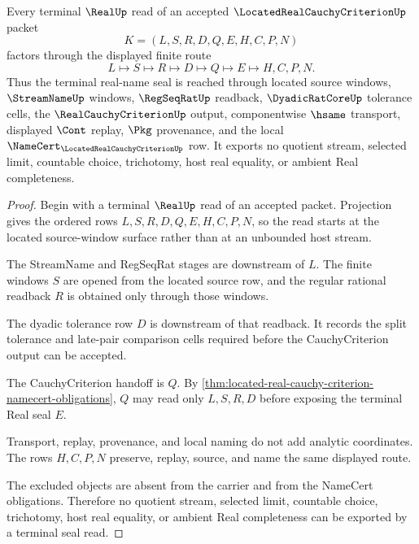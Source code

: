 \begin{theorem}
\label{thm:located-real-cauchy-criterion-terminal-seal-route}
Every terminal $\RealUp$ read of an accepted $\LocatedRealCauchyCriterionUp$ packet
$$
K=(L,S,R,D,Q,E,H,C,P,N)
$$
factors through the displayed finite route
$$
L \longmapsto S \longmapsto R \longmapsto D \longmapsto Q \longmapsto E \longmapsto H,C,P,N .
$$
Thus the terminal real-name seal is reached through located source windows, $\StreamNameUp$ windows, $\RegSeqRatUp$ readback, $\DyadicRatCoreUp$ tolerance cells, the $\RealCauchyCriterionUp$ output, componentwise $\hsame$ transport, displayed $\Cont$ replay, $\Pkg$ provenance, and the local $\NameCert_{\LocatedRealCauchyCriterionUp}$ row. It exports no quotient stream, selected limit, countable choice, trichotomy, host real equality, or ambient Real completeness.
\end{theorem}
\begin{proof}
Begin with a terminal $\RealUp$ read of an accepted packet. Projection gives the ordered rows $L,S,R,D,Q,E,H,C,P,N$, so the read starts at the located source-window surface rather than at an unbounded host stream.

The StreamName and RegSeqRat stages are downstream of $L$. The finite windows $S$ are opened from the located source row, and the regular rational readback $R$ is obtained only through those windows.

The dyadic tolerance row $D$ is downstream of that readback. It records the split tolerance and late-pair comparison cells required before the CauchyCriterion output can be accepted.

The CauchyCriterion handoff is $Q$. By \autoref{thm:located-real-cauchy-criterion-namecert-obligations}, $Q$ may read only $L,S,R,D$ before exposing the terminal Real seal $E$.

Transport, replay, provenance, and local naming do not add analytic coordinates. The rows $H,C,P,N$ preserve, replay, source, and name the same displayed route.

The excluded objects are absent from the carrier and from the NameCert obligations. Therefore no quotient stream, selected limit, countable choice, trichotomy, host real equality, or ambient Real completeness can be exported by a terminal seal read.
\end{proof}


